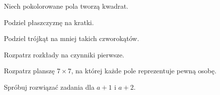 
\begin{hints_list}
	\item Niech pokolorowane pola tworzą kwadrat.
	\item Podziel płaszczyznę na kratki.
	\item Podziel trójkąt na mniej takich czworokątów.
	\item Rozpatrz rozkłady na czynniki pierwsze.
	\item Rozpatrz planszę $7\times7$, na której każde pole reprezentuje pewną osobę.
	\item Spróbuj rozwiązać zadania dla $a + 1$ i $a + 2$.
\end{hints_list}